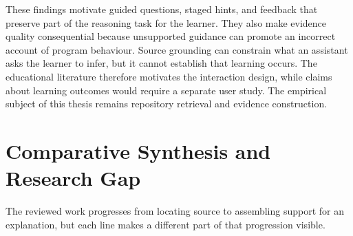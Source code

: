 These findings motivate guided questions, staged hints, and feedback that preserve part of the reasoning task for the learner. They also make evidence quality consequential because unsupported guidance can promote an incorrect account of program behaviour. Source grounding can constrain what an assistant asks the learner to infer, but it cannot establish that learning occurs. The educational literature therefore motivates the interaction design, while claims about learning outcomes would require a separate user study. The empirical subject of this thesis remains repository retrieval and evidence construction.

\section{Comparative Synthesis and Research Gap}\label{sec:comparative-synthesis-and-research-gap}

The reviewed work progresses from locating source to assembling support for an explanation, but each line makes a different part of that progression visible.

